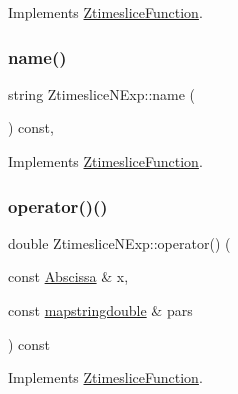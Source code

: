 Implements \mbox{\hyperlink{classZtimesliceFunction_a3c98a40a6155270bbb11d74c1b0f838c}{Ztimeslice\+Function}}.

\mbox{\label{classZtimesliceNExp_a012d885734f62a67b2d1ffc0d4128b0b}} 
\subsubsection{\texorpdfstring{name()}{name()}\hspace{0.1cm}{\footnotesize\ttfamily [2/2]}}
{\footnotesize\ttfamily string Ztimeslice\+N\+Exp\+::name (\begin{DoxyParamCaption}{ }\end{DoxyParamCaption}) const\hspace{0.3cm}{\ttfamily [inline]}, {\ttfamily [virtual]}}



Implements \mbox{\hyperlink{classZtimesliceFunction_a3c98a40a6155270bbb11d74c1b0f838c}{Ztimeslice\+Function}}.

\mbox{\label{classZtimesliceNExp_af9ac01b3a80221dd8bf1a0a11cbdbb66}} 
\subsubsection{\texorpdfstring{operator()()}{operator()()}\hspace{0.1cm}{\footnotesize\ttfamily [1/4]}}
{\footnotesize\ttfamily double Ztimeslice\+N\+Exp\+::operator() (\begin{DoxyParamCaption}\item[{const \mbox{\hyperlink{classAbscissa}{Abscissa}} \&}]{x,  }\item[{const \mbox{\hyperlink{lib_2fitting__lib_2includes_8h_a647b481c557c7966517f753340a81d13}{mapstringdouble}} \&}]{pars }\end{DoxyParamCaption}) const\hspace{0.3cm}{\ttfamily [virtual]}}



Implements \mbox{\hyperlink{classZtimesliceFunction_ae7851ae590054311c69cdafc8f7ed621}{Ztimeslice\+Function}}.

\mbox{\label{classZtimesliceNExp_af9ac01b3a80221dd8bf1a0a11cbdbb66}} 
